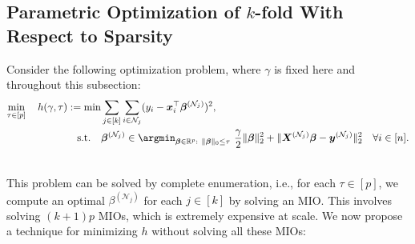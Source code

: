 \documentclass[ijoc,noblindrev]{informs3} %
\begin{document}


\subsection{Parametric Optimization of $k$-fold With Respect to Sparsity}\label{ssec:parametric}

Consider the following optimization problem, where $\gamma$ is fixed here and throughout this subsection:
{\color{black}
\begin{equation}\label{eq:paramK}
\begin{aligned}
\min_{\tau\in [p]} \quad h({\gamma}, \tau):=\min_{} & \sum_{j \in [k]}\sum_{i \in \mathcal{N}_j} (y_i-\bm{x}_i^\top \bm{\beta}^{(\mathcal{N}_j)})^2,\\
\text{s.t.} \quad  & \bm{\beta}^{(\mathcal{N}_j)} \in \argmin_{\bm{\beta} \in \mathbb{R}^p: \ \Vert\bm{\beta}\Vert_0\leq \tau} \ \frac{\gamma}{2}\Vert \bm{\beta}\Vert_2^2 +\Vert \bm{X}^{(\mathcal{N}_j)}\bm{\beta}-\bm{y}^{(\mathcal{N}_j)}\Vert_2^2\quad \forall i \in [n].\\[2em]
\end{aligned}
\end{equation}}
This problem can be solved by complete enumeration, i.e., for each $\tau \in[p]$, we compute an optimal $\beta^{(\mathcal{N}_j)}$ for each $j\in [k]$ by solving an MIO. This involves solving $(k+1)p$ MIOs, which is extremely expensive at scale. We now propose a technique for minimizing $h$ without solving all these MIOs: 
\end{document}
